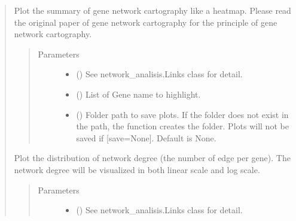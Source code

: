 \documentclass[letterpaper,10pt,english]{sphinxmanual}
\begin{document}
\begin{quote}
\begin{fulllineitems}
\begin{fulllineitems}
\label{\detokenize{modules/celloracle.network_analysis:celloracle.network_analysis.Links.plot_cartography_term}}
Plot the summary of gene network cartography like a heatmap.
Please read the original paper of gene network cartography for the principle of gene network cartography.
\begin{quote}\begin{description}
\item[{Parameters}] \leavevmode\begin{itemize}
\item {} 
 ({\hyperref[\detokenize{modules/celloracle:celloracle.Links}]{}}) \textendash{} See network\_analisis.Links class for detail.

\item {} 
 () \textendash{} List of Gene name to highlight.

\item {} 
 () \textendash{} Folder path to save plots. If the folder does not exist in the path, the function creates the folder.
Plots will not be saved if {[}save=None{]}. Default is None.

\end{itemize}

\end{description}\end{quote}

\end{fulllineitems}


\begin{fulllineitems}
\label{\detokenize{modules/celloracle.network_analysis:celloracle.network_analysis.Links.plot_degree_distributions}}
Plot the distribution of network degree (the number of edge per gene).
The network degree will be visualized in both linear scale and log scale.
\begin{quote}\begin{description}
\item[{Parameters}] \leavevmode\begin{itemize}
\item {} 
 ({\hyperref[\detokenize{modules/celloracle:celloracle.Links}]{}}) \textendash{} See network\_analisis.Links class for detail.


\end{itemize}
\end{description}
\end{quote}
\end{fulllineitems}
\end{fulllineitems}
\end{quote}
\end{document}
